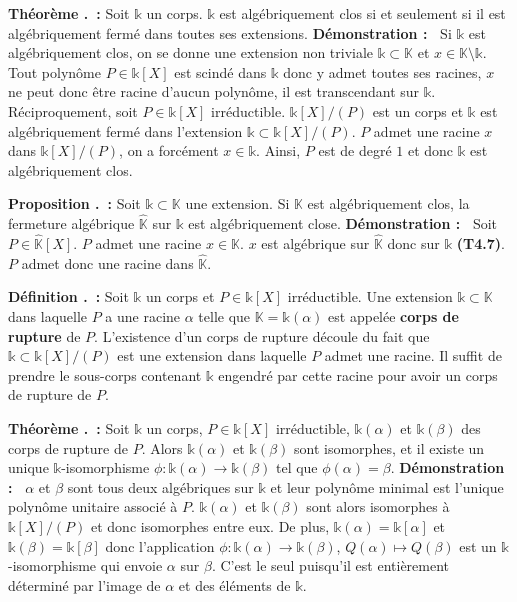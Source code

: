 \documentclass[5pt,a4paper]{article}
\newcounter{prop}[section]
\newcounter{defin}[section]
\newcounter{thm}[section]
\renewcommand{\theprop}{\thesection.\arabic{prop}}
\renewcommand{\thedefin}{\thesection.\arabic{defin}}
\renewcommand{\thethm}{\thesection.\arabic{thm}}
\newcommand{\prop}[1]{\stepcounter{prop}\noindent\textbf{Proposition \theprop ~:} #1 \newline}
\newcommand{\defin}[1]{\stepcounter{defin}\noindent\textbf{Définition \thedefin ~:} #1 \newline}
\newcommand{\thm}[1]{\stepcounter{thm}\noindent\textbf{Théorème \thethm ~:} #1 \newline}
\newcommand{\demo}[1]{\textbf{Démonstration :~} #1 \newline}
\begin{document}
\begin{onehalfspacing}
\thm{Soit $\mathds{k}$ un corps. $\mathds{k}$ est algébriquement clos si et seulement si il est algébriquement fermé dans toutes ses extensions.}
\demo{Si $\mathds{k}$ est algébriquement clos, on se donne une extension non triviale $\mathds{k} \subset \mathbb{K}$ et $x \in \mathbb{K}\setminus\mathds{k}$. Tout polynôme $P \in \mathds{k}[X]$ est scindé dans $\mathds{k}$ donc y admet toutes ses racines, $x$ ne peut donc être racine d'aucun polynôme, il est transcendant sur $\mathds{k}$. Réciproquement, soit $P \in \mathds{k}[X]$ irréductible. $\mathds{k}[X]/(P)$ est un corps et $\mathds{k}$ est algébriquement fermé dans l'extension $\mathds{k} \subset \mathds{k}[X]/(P)$. $P$ admet une racine $x$ dans $\mathds{k}[X]/(P)$, on a forcément $x \in \mathds{k}$. Ainsi, $P$ est de degré $1$ et donc $\mathds{k}$ est algébriquement clos.}


\prop{Soit $\mathds{k} \subset \mathbb{K}$ une extension. Si $\mathbb{K}$ est algébriquement clos, la fermeture algébrique $\hat{\mathbb{K}}$ sur $\mathds{k}$ est algébriquement close.}
\demo{Soit $P \in \hat{\mathbb{K}}[X]$. $P$ admet une racine $x \in \mathbb{K}$. $x$ est algébrique sur $\hat{\mathbb{K}}$ donc sur $\mathds{k}$ \textbf{(T4.7)}. $P$ admet donc une racine dans $\hat{\mathbb{K}}$.}


\defin{Soit $\mathds{k}$ un corps et $P \in \mathds{k}[X]$ irréductible. Une extension $\mathds{k} \subset \mathbb{K}$ dans laquelle $P$ a une racine $\alpha$ telle que $\mathbb{K} = \mathds{k}(\alpha)$ est appelée \textbf{corps de rupture} de $P$. L'existence d'un corps de rupture découle du fait que $\mathds{k} \subset \mathds{k}[X]/(P)$ est une extension dans laquelle $P$ admet une racine. Il suffit de prendre le sous-corps contenant $\mathds{k}$ engendré par cette racine pour avoir un corps de rupture de $P$.} 
\newline


\thm{Soit $\mathds{k}$ un corps, $P \in \mathds{k}[X]$ irréductible, $\mathds{k}(\alpha)$ et $\mathds{k}(\beta)$ des corps de rupture de $P$. Alors $\mathds{k}(\alpha)$ et $\mathds{k}(\beta)$ sont isomorphes, et il existe un unique $\mathds{k}$-isomorphisme $\phi : \mathds{k}(\alpha) \rightarrow \mathds{k}(\beta)$ tel que $\phi(\alpha) = \beta$.}
\demo{$\alpha$ et $\beta$ sont tous deux algébriques sur $\mathds{k}$ et leur polynôme minimal est l'unique polynôme unitaire associé à $P$. $\mathds{k}(\alpha)$ et $\mathds{k}(\beta)$ sont alors isomorphes à $\mathds{k}[X]/(P)$ et donc isomorphes entre eux. De plus, $\mathds{k}(\alpha) = \mathds{k}[\alpha]$ et $\mathds{k}(\beta) = \mathds{k}[\beta]$ donc l'application $\phi : \mathds{k}(\alpha) \rightarrow \mathds{k}(\beta)$, $Q(\alpha) \mapsto Q(\beta)$ est un $\mathds{k}$-isomorphisme qui envoie $\alpha$ sur $\beta$. C'est le seul puisqu'il est entièrement déterminé par l'image de $\alpha$ et des éléments de $\mathds{k}$.}



\end{onehalfspacing}
\end{document}
